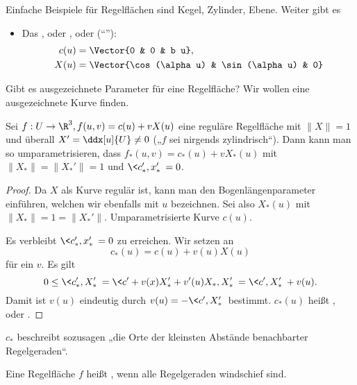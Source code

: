 \begin{ex}
	Einfache Beispiele für Regelflächen sind Kegel, Zylinder, Ebene.
	Weiter gibt es
	\begin{itemize}
		\item
			Das , oder , oder  (“”):
			\begin{align*}
				c(u) &= \Vector{0 & 0 & b u}, \\
				X(u) &= \Vector{\cos(\alpha u) & \sin(\alpha u) & 0}
			\end{align*}
	\end{itemize}
\end{ex}

Gibt es ausgezeichnete Parameter für eine Regelfläche?
Wir wollen eine ausgezeichnete Kurve finden.

\begin{lem}[Standardparameter]
	Sei $f: U \to \R^3, f(u,v) = c(u) + v X(u)$ eine reguläre Regelfläche mit $\|X\| = 1$ und überall $X' = \ddx[u]{U} \neq 0$ („$f$ sei nirgends zylindrisch“).
	Dann kann man so umparametrisieren, dass $f_*(u,v) = c_*(u) + vX_*(u)$ mit $\|X_*\| = \|X_*'\| = 1$ und $\<c_*', x_*'\> = 0$.
	\begin{proof}
		Da $X$ als Kurve regulär ist, kann man den Bogenlängenparameter einführen, welchen wir ebenfalls mit $u$ bezeichnen.
		Sei also $X_*(u)$ mit $\|X_*\| = 1 = \|X_*'\|$.
		Umparametrisierte Kurve $c(u)$.

		Es verbleibt $\<c_*', x_*'\> = 0$ zu erreichen.
		Wir setzen an
		\[
			c_*(u) = c(u) + v(u) X(u)
		\]
		für ein $v$.
		Es gilt
		\[
			0 \le \<c_*', X_*'\>
			= \<c' + v(x)X_*' + v'(u) X_*, X_*'\>
			= \<c', X_*'\> + v(u).
		\]
		Damit ist $v(u)$ eindeutig durch $v(u) = -\<c', X_*'\>$ bestimmt.
		$c_*(u)$ heißt , oder .
	\end{proof}
	\begin{note}
		$c_*$ beschreibt sozusagen „die Orte der kleinsten Abstände benachbarter Regelgeraden“.
	\end{note}
\end{lem}

\begin{df}
	Eine Regelfläche $f$ heißt , wenn alle Regelgeraden windschief sind.
\end{df}

